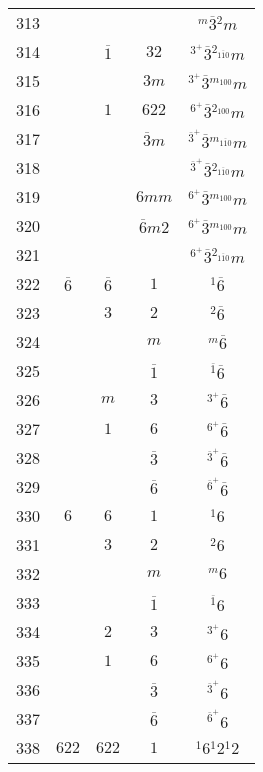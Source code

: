 \begin{longtable}{ccccc}
  313 &  &  &  & ${}^{m} \overline{3} {}^{2} m $\\
  314 &  & $\overline{1}$ & $32$ & ${}^{3^{+}} \overline{3} {}^{2_{1\overline{1}0}} m $\\
  315 &  &  & $3m$ & ${}^{3^{+}} \overline{3} {}^{m_{100}} m $\\
  316 &  & $1$ & $622$ & ${}^{6^{+}} \overline{3} {}^{2_{100}} m $\\
  317 &  &  & $\overline{3}m$ & ${}^{\overline{3}^{+}} \overline{3} {}^{m_{1\overline{1}0}} m $\\
  318 &  &  &  & ${}^{\overline{3}^{+}} \overline{3} {}^{2_{1\overline{1}0}} m $\\
  319 &  &  & $6mm$ & ${}^{6^{+}} \overline{3} {}^{m_{100}} m $\\
  320 &  &  & $\overline{6}m2$ & ${}^{6^{+}} \overline{3} {}^{m_{100}} m $\\
  321 &  &  &  & ${}^{6^{+}} \overline{3} {}^{2_{1\overline{1}0}} m $\\
  322 & $\overline{6}$ & $\overline{6}$ & $1$ & ${}^{1} \overline{6} $\\
  323 &  & $3$ & $2$ & ${}^{2} \overline{6} $\\
  324 &  &  & $m$ & ${}^{m} \overline{6} $\\
  325 &  &  & $\overline{1}$ & ${}^{\overline{1}} \overline{6} $\\
  326 &  & $m$ & $3$ & ${}^{3^{+}} \overline{6} $\\
  327 &  & $1$ & $6$ & ${}^{6^{+}} \overline{6} $\\
  328 &  &  & $\overline{3}$ & ${}^{\overline{3}^{+}} \overline{6} $\\
  329 &  &  & $\overline{6}$ & ${}^{\overline{6}^{+}} \overline{6} $\\
  330 & $6$ & $6$ & $1$ & ${}^{1} 6 $\\
  331 &  & $3$ & $2$ & ${}^{2} 6 $\\
  332 &  &  & $m$ & ${}^{m} 6 $\\
  333 &  &  & $\overline{1}$ & ${}^{\overline{1}} 6 $\\
  334 &  & $2$ & $3$ & ${}^{3^{+}} 6 $\\
  335 &  & $1$ & $6$ & ${}^{6^{+}} 6 $\\
  336 &  &  & $\overline{3}$ & ${}^{\overline{3}^{+}} 6 $\\
  337 &  &  & $\overline{6}$ & ${}^{\overline{6}^{+}} 6 $\\
  338 & $622$ & $622$ & $1$ & ${}^{1} 6 {}^{1} 2 {}^{1} 2 $\\

\end{longtable}
